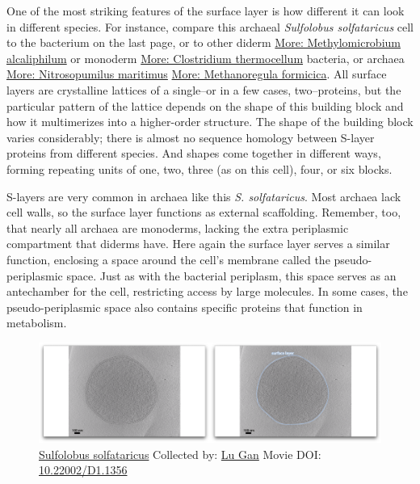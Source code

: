 \documentclass[]{tufte-book}
\begin{document}
One of the most striking features of the surface layer is how different
it can look in different species. For instance, compare this archaeal
\emph{Sulfolobus solfataricus} cell to the bacterium on the last page,
or to other diderm
\protect\hyperlink{Methylomicrobium_alcaliphilum}{More: Methylomicrobium
alcaliphilum} or monoderm
\protect\hyperlink{Clostridium_thermocellum}{More: Clostridium
thermocellum} bacteria, or archaea
\protect\hyperlink{Nitrosopumilus_maritimus}{More: Nitrosopumilus
maritimus} \protect\hyperlink{Methanoregula_formicica}{More:
Methanoregula formicica}. All surface layers are crystalline lattices of
a single--or in a few cases, two--proteins, but the particular pattern
of the lattice depends on the shape of this building block and how it
multimerizes into a higher-order structure. The shape of the building
block varies considerably; there is almost no sequence homology between
S-layer proteins from different species. And shapes come together in
different ways, forming repeating units of one, two, three (as on this
cell), four, or six blocks.

S-layers are very common in archaea like this \emph{S. solfataricus}.
Most archaea lack cell walls, so the surface layer functions as external
scaffolding. Remember, too, that nearly all archaea are monoderms,
lacking the extra periplasmic compartment that diderms have. Here again
the surface layer serves a similar function, enclosing a space around
the cell's membrane called the pseudo-periplasmic space. Just as with
the bacterial periplasm, this space serves as an antechamber for the
cell, restricting access by large molecules. In some cases, the
pseudo-periplasmic space also contains specific proteins that function
in metabolism.





\begin{figure}
\includegraphics{movie_stills/2_7} \caption[\protect\hyperlink{tree}{Sulfolobus solfataricus} Collected
by: \protect\hyperlink{lu_gan}{Lu Gan} Movie DOI:
\href{https://doi.org/10.22002/D1.1356}{10.22002/D1.1356}]{\protect\hyperlink{tree}{Sulfolobus solfataricus} Collected
by: \protect\hyperlink{lu_gan}{Lu Gan} Movie DOI:
\href{https://doi.org/10.22002/D1.1356}{10.22002/D1.1356}}\label{fig:2-7}
\end{figure}
\end{document}
